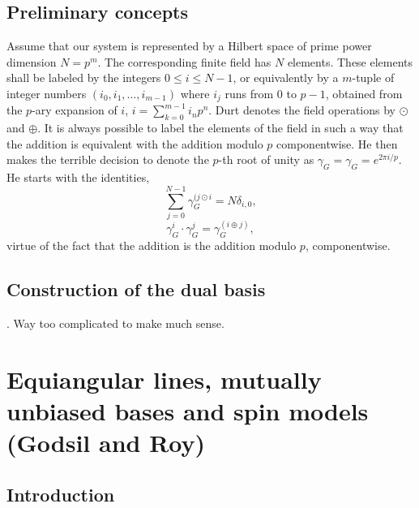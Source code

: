 \documentclass[a4paper]{article}
\begin{document}
  \subsection{Preliminary concepts}

  Assume that our system is represented by a Hilbert space
  of prime power dimension $N = p^{m}$. The corresponding
  finite field has $N$ elements. These elements shall be
  labeled by the integers $0 \leq i \leq N - 1$, or
  equivalently by a $m$-tuple of integer numbers
  $(i_0,i_1,\ldots,i_{m-1})$ where $i_j$ runs from $0$ to
  $p-1$, obtained from the $p$-ary expansion of $i$, $i =
  \sum_{k=0}^{m-1} i_n p^{n}$. Durt denotes the field
  operations by $\odot$ and $\oplus$. It is always possible
  to label the elements of the field in such a way that the
  addition is equivalent with the addition modulo $p$ 
  componentwise. He then makes the terrible decision to
  denote the  $p$-th root of unity as $\gamma_G = \gamma_G =
  e^{2\pi i / p}$. He starts with the identities,
  \[
    \sum_{j=0}^{N-1} \gamma_G^{(j \odot i}
    = N \delta_{i,0},
  \] 
  \[
    \gamma_G^i \cdot \gamma_G^j
    = \gamma_G^{(i \oplus j)},
  \] 
  virtue of the fact that the addition is the addition
  modulo $p$, componentwise.

  \subsection{Construction of the dual basis}

  . Way too complicated to make much sense.

  \section{Equiangular lines, mutually unbiased bases and
  spin models (Godsil and Roy)}

  \subsection{Introduction}
\end{document}
